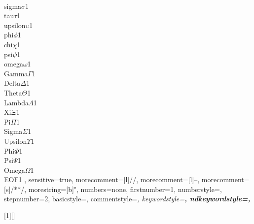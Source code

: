 {    {\\sigma}{$\sigma$}1
    {\\tau}{$\tau$}1
    {\\upsilon}{$\upsilon$}1
    {\\phi}{$\phi$}1
    {\\chi}{$\chi$}1
    {\\psi}{$\psi$}1
    {\\omega}{$\omega$}1
    {\\Gamma}{$\Gamma$}1
    {\\Delta}{$\Delta$}1
    {\\Theta}{$\Theta$}1
    {\\Lambda}{$\Lambda$}1
    {\\Xi}{$\Xi$}1
    {\\Pi}{$\Pi$}1
    {\\Sigma}{$\Sigma$}1
    {\\Upsilon}{$\Upsilon$}1
    {\\Phi}{$\Phi$}1
    {\\Psi}{$\Psi$}1
    {\\Omega}{$\Omega$}1
    {\\EOF}{\;}1
    ,
  sensitive=true,  %
  morecomment=[l]//,%
  morecomment=[l]{--},%
  morecomment=[s]{/*}{*/},%
  morestring=[b]",
  numbers=none,
  firstnumber=1,
  numberstyle=\tiny,
  stepnumber=2,
  basicstyle=\scriptsize\ttfamily,
  commentstyle=\color[HTML]{00A108}\itshape,
  keywordstyle=\color[HTML]{2835C0}\bfseries,
  ndkeywordstyle=\bfseries,
}

\def\A{%
    \lstinline[language=alloy,basicstyle=\ttfamily,columns=fixed]}

% paragraph
[1][]{%
  }{}

\newcommand{\alloyfile}[1]{
  
}

